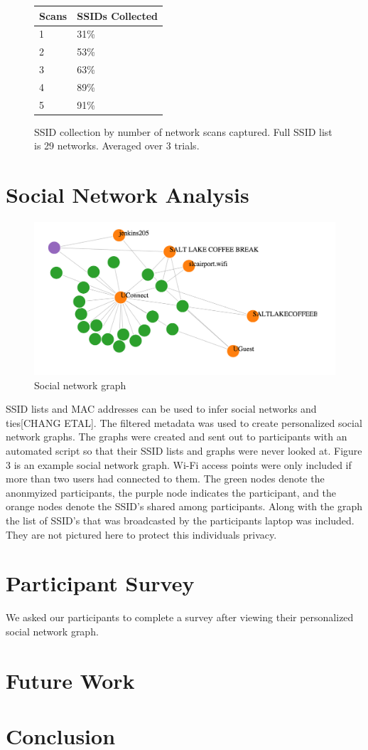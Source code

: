 \documentclass[letterpaper,twocolumn,10pt]{article}
\begin{document}
\begin{figure}
\centering
\begin{tabular}{l | l}
Scans & SSIDs Collected \\ 
\hline
1 & 31\% \\
2 & 53\% \\
3 & 63\% \\
4 & 89\% \\
5 & 91\% \\
\end{tabular}
\caption{SSID collection by number of network scans captured. Full SSID list is 29 networks. Averaged over 3 trials.}
\end{figure}

\section{Social Network Analysis}
\begin{figure}
\centering
\includegraphics[scale=.5]{graph.png}
\caption{\textsf{Social network graph}}
\end{figure}
SSID lists and MAC addresses can be used to infer social networks and ties[CHANG ETAL]. The filtered metadata was used to create personalized social network graphs. The graphs were created and sent out to participants with an automated script so that their SSID lists and graphs were never looked at. 
Figure 3 is an example social network graph. Wi-Fi access points were only included if more than two users had connected to them. The green nodes denote the anonmyized participants, the purple node indicates the participant, and the orange nodes denote the SSID's shared among participants. Along with the graph the list of SSID's that was broadcasted by the participants laptop was included. They are not pictured here to protect this individuals privacy.

\section{Participant Survey}
We asked our participants to complete a survey after viewing their personalized social network graph.


\section{Future Work}

\section{Conclusion}
\end{document}
